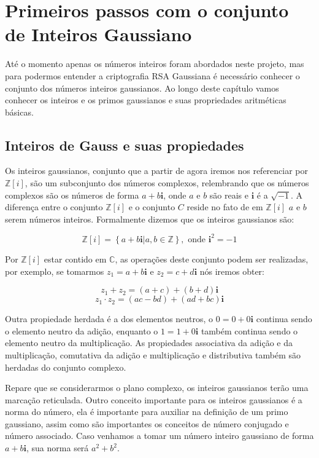 \pagestyle{fancy}
\fancyhead[R]{\thepage}
\fancyfoot[C]{}



\chapter {Primeiros passos com o conjunto de Inteiros Gaussiano}
\label{IG}
At\'e o momento apenas os n\'umeros inteiros foram abordados neste projeto, mas para podermos entender a criptografia RSA Gaussiana \'e necess\'ario conhecer o conjunto dos n\'umeros inteiros gaussianos. Ao longo deste cap\'itulo vamos conhecer os inteiros e os primos gaussianos e suas propriedades aritm\'eticas b\'asicas. 

\section{Inteiros de Gauss e suas propiedades}

Os inteiros gaussianos, conjunto que a partir de agora iremos nos referenciar por $\mathbb{Z}[i]$, s\~ao um subconjunto dos n\'umeros complexos, relembrando que os n\'umeros complexos s\~ao os n\'umeros de forma $a+b\textbf{i}$, onde $a$ e $b$ s\~ao reais e $\textbf{i}$ \'e a $\sqrt{-1}$. A diferen\c{c}a entre o conjunto $\mathbb{Z}[i]$ e o conjunto $C$ reside no fato de em $\mathbb{Z}[i]$ $a$ e $b$ serem n\'umeros inteiros. Formalmente dizemos que os inteiros gaussianos s\~ao:

$$\mathbb{Z}[i]= \left\{a+b\textbf{i} | a,b \in \mathbb{Z}  \right\}, \textrm{ onde } \textbf{i}^2 = -1$$

Por $\mathbb{Z}[i]$ estar contido em $\mathbb{C}$, as opera\c{c}\~oes deste conjunto podem ser realizadas, por exemplo, se tomarmos $z_1= a + b\textbf{i}$ e $z_2= c + d\textbf{i}$ n\'os iremos obter:

$$z_1   +   z_2 = (a + c) + (b + d)\textbf{i}$$
$$z_1 \cdot z_2 = (ac - bd) + (ad + bc)\textbf{i}$$

Outra propiedade herdada \'e a dos elementos neutros, o $0 = 0 + 0\textbf{i}$ continua sendo o elemento neutro da adi\c{c}\~ao, enquanto o $1 = 1 + 0\textbf{i}$ tamb\'em continua sendo o elemento neutro da multiplica\c{c}\~ao. As propiedades associativa da adi\c{c}\~ao e da multiplica\c{c}\~ao, comutativa da adi\c{c}\~ao e multiplica\c{c}\~ao e distributiva tamb\'em s\~ao herdadas do conjunto complexo.

Repare que se considerarmos o plano complexo, os inteiros gaussianos ter\~ao uma marca\c{c}\~ao reticulada. Outro conceito importante para os inteiros gaussianos \'e a norma do n\'umero, ela \'e importante para auxiliar na defini\c{c}\~ao de um primo gaussiano, assim como s\~ao importantes os conceitos de n\'umero conjugado e n\'umero associado. Caso venhamos a tomar um n\'umero inteiro gaussiano de forma $a+b\textbf{i}$, sua norma ser\'a $a^2 +b^2$.

